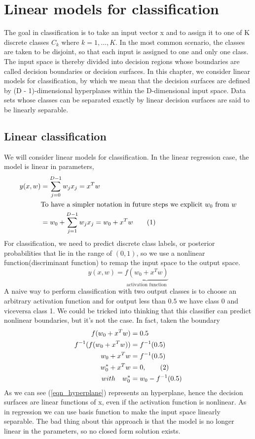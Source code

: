 \documentclass[main.tex]{subfiles}
\newcommand\numberthis{\addtocounter{equation}{1}\tag{\theequation}}
\begin{document}
\section{Linear models for classification}
The goal in classification is to take an
input vector x and to assign it to one of K discrete classes $C_k$ where $k = 1,...,K$.
In the most common scenario, the classes are taken to be disjoint, so that each input is
assigned to one and only one class. The input space is thereby divided into decision
regions whose boundaries are called decision boundaries or decision surfaces. In
this chapter, we consider linear models for classification, by which we mean that the
decision surfaces are defined by (D - 1)-dimensional hyperplanes within the D-dimensional input space. Data
sets whose classes can be separated exactly by linear decision surfaces are said to be
linearly separable.

\subsection{Linear classification}
We will consider linear models for classification. In the linear regression case, the model is linear in parameters,
\begin{align*}
    y(x,w) & = \sum_{j=0}^{D-1} w_jx_j = x^Tw                                                  \\
           & \text{To have a simpler notation in future steps we explicit }w_0 \text{ from } w \\
           & = w_0 + \sum_{j=1}^{D-1} w_jx_j = w_0 + x^Tw \numberthis
\end{align*}
For classification, we need to predict discrete class labels, or posterior probabilities that lie in the range of $(0,1)$, so we use a nonlinear function(discriminant function) to remap the input space to the output space.
\begin{equation*}
    y(x,w) = \underbrace{f(w_0 + x^Tw)}_{\text{activation function}}
\end{equation*}
A naive way to perform classification with two output classes is to choose an arbitrary activation function and for output less than $0.5$ we have class 0 and viceversa class 1. We could be tricked into thinking that this classifier can predict nonlinear boundaries, but it's not the case. In fact, taken the boundary
\begin{align*}
    f(w_0 + x^Tw)         & = 0.5                                   \\
    f^{-1}(f(w_0 + x^Tw)) & = f^{-1}(0.5)                           \\
    w_0 + x^Tw            & = f^{-1}(0.5)                           \\
    w_0^* + x^Tw          & = 0, \numberthis \label{eqn_hyperplane} \\
    with \quad w_0^*      & = w_0 - f^{-1}(0.5)
\end{align*}
As we can see (\ref{eqn_hyperplane}) represents an hyperplane, hence the decision surfaces are linear functions of x, even if the activation function is nonlinear. As in regression we can use basis function to make the input space linearly separable. The bad thing about this approach is that the model is no longer linear in the parameters, so no closed form solution exists.
\end{document}
